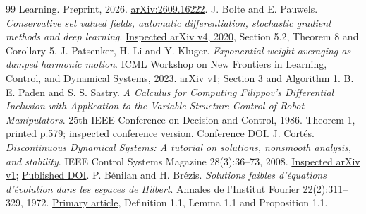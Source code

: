 \documentclass[11pt,a4paper]{article}
\begin{document}
\begin{thebibliography}{99}
{Learning}. Preprint, 2026.
\href{https://arxiv.org/abs/2609.16222}{arXiv:2609.16222}.
 J. Bolte and E. Pauwels.
\emph{Conservative set valued fields, automatic differentiation,
stochastic gradient methods and deep learning}.
\href{https://arxiv.org/abs/1909.10300v4}{Inspected arXiv v4, 2020},
Section 5.2, Theorem 8 and Corollary 5.
 J. Patsenker, H. Li and Y. Kluger.
\emph{Exponential weight averaging as damped harmonic motion}.
ICML Workshop on New Frontiers in Learning, Control, and Dynamical Systems, 2023.
\href{https://arxiv.org/abs/2310.13854v1}{arXiv v1}; Section 3 and Algorithm 1.
 B. E. Paden and S. S. Sastry.
\emph{A Calculus for Computing Filippov's Differential Inclusion with
Application to the Variable Structure Control of Robot Manipulators}.
25th IEEE Conference on Decision and Control, 1986.
Theorem 1, printed p.579; inspected conference version.
\href{https://doi.org/10.1109/CDC.1986.267369}{Conference DOI}.
 J. Cort\'es. \emph{Discontinuous Dynamical Systems:
A tutorial on solutions, nonsmooth analysis, and stability}.
IEEE Control Systems Magazine 28(3):36--73, 2008.
\href{https://arxiv.org/abs/0901.3583v1}{Inspected arXiv v1};
\href{https://doi.org/10.1109/MCS.2008.919306}{Published DOI}.
 P. B\'enilan and H. Br\'ezis.
\emph{Solutions faibles d'\'equations d'\'evolution dans les espaces de Hilbert}.
Annales de l'Institut Fourier 22(2):311--329, 1972.
\href{https://aif.centre-mersenne.org/item/AIF_1972__22_2_311_0/}{Primary article},
Definition 1.1, Lemma 1.1 and Proposition 1.1.
\end{thebibliography}
\end{document}
